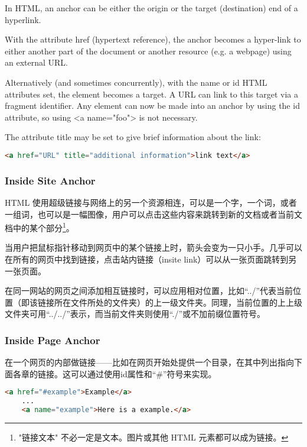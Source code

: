 In HTML, an anchor can be either the origin or the target (destination) end of a hyperlink.

With the attribute href (hypertext reference), the anchor becomes a hyper-link to either another part of the document or another resource (e.g. a webpage) using an external URL.

Alternatively (and sometimes concurrently), with the name or id HTML attributes set, the element becomes a target. A  URL can link to this target via a fragment identifier. Any element can now be made into an anchor by using the id attribute, so using <a name="foo"> is not necessary.

The attribute title may be set to give brief information about the link:

\begin{lstlisting}[language=HTML]
	<a href="URL" title="additional information">link text</a>
\end{lstlisting}



\subsubsection{Inside Site Anchor}

HTML 使用超级链接与网络上的另一个资源相连，可以是一个字，一个词，或者一组词，也可以是一幅图像，用户可以点击这些内容来跳转到新的文档或者当前文档中的某个部分\footnote{"链接文本" 不必一定是文本。图片或其他 HTML 元素都可以成为链接。}。

当用户把鼠标指针移动到网页中的某个链接上时，箭头会变为一只小手。几乎可以在所有的网页中找到链接，点击站内链接（insite link）可以从一张页面跳转到另一张页面。

在同一网站的网页之间添加相互链接时，可以应用相对位置，比如“../”代表当前位置（即该链接所在文件所处的文件夹）的上一级文件夹。同理，当前位置的上上级文件夹可用“../../”表示，而当前文件夹则使用“./”或不加前缀位置符号。


\subsubsection{Inside Page Anchor}


在一个网页的内部做链接——比如在网页开始处提供一个目录，在其中列出指向下面各章的链接。这可以通过使用id属性和“\#”符号来实现。

\begin{lstlisting}[language=HTML]
	<a href="#example">Example</a>
	...
	<a name="example">Here is a example.</a>
\end{lstlisting}



